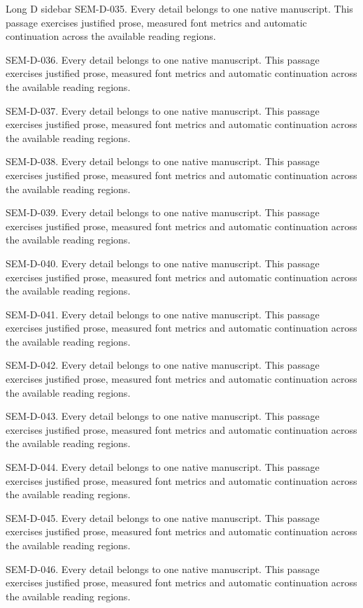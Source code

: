 \begin{m20sidebarwide}[columns=2,id=long-wide2]{Long D sidebar}
SEM-D-035. Every detail belongs to one native manuscript. This passage exercises justified prose, measured font metrics and automatic continuation across the available reading regions.\par
SEM-D-036. Every detail belongs to one native manuscript. This passage exercises justified prose, measured font metrics and automatic continuation across the available reading regions.\par
SEM-D-037. Every detail belongs to one native manuscript. This passage exercises justified prose, measured font metrics and automatic continuation across the available reading regions.\par
SEM-D-038. Every detail belongs to one native manuscript. This passage exercises justified prose, measured font metrics and automatic continuation across the available reading regions.\par
SEM-D-039. Every detail belongs to one native manuscript. This passage exercises justified prose, measured font metrics and automatic continuation across the available reading regions.\par
SEM-D-040. Every detail belongs to one native manuscript. This passage exercises justified prose, measured font metrics and automatic continuation across the available reading regions.\par
SEM-D-041. Every detail belongs to one native manuscript. This passage exercises justified prose, measured font metrics and automatic continuation across the available reading regions.\par
SEM-D-042. Every detail belongs to one native manuscript. This passage exercises justified prose, measured font metrics and automatic continuation across the available reading regions.\par
SEM-D-043. Every detail belongs to one native manuscript. This passage exercises justified prose, measured font metrics and automatic continuation across the available reading regions.\par
SEM-D-044. Every detail belongs to one native manuscript. This passage exercises justified prose, measured font metrics and automatic continuation across the available reading regions.\par
SEM-D-045. Every detail belongs to one native manuscript. This passage exercises justified prose, measured font metrics and automatic continuation across the available reading regions.\par
SEM-D-046. Every detail belongs to one native manuscript. This passage exercises justified prose, measured font metrics and automatic continuation across the available reading regions.\par

\end{m20sidebarwide}
